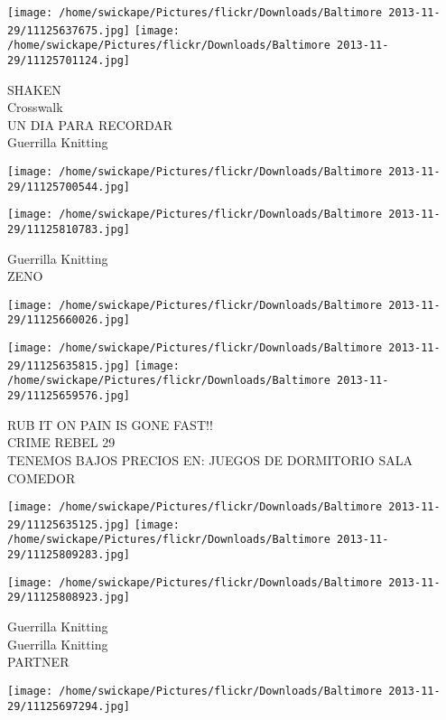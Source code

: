 \documentclass[10pt,letterpaper]{article}
\begin{document}
\texttt{[image: /home/swickape/Pictures/flickr/Downloads/Baltimore 2013-11-29/11125637675.jpg]}
\texttt{[image: /home/swickape/Pictures/flickr/Downloads/Baltimore 2013-11-29/11125701124.jpg]}

SHAKEN\\
Crosswalk\\
UN DIA PARA RECORDAR\\
Guerrilla Knitting\\
\pagebreak

\texttt{[image: /home/swickape/Pictures/flickr/Downloads/Baltimore 2013-11-29/11125700544.jpg]}

\vspace{0.25in}
\texttt{[image: /home/swickape/Pictures/flickr/Downloads/Baltimore 2013-11-29/11125810783.jpg]}

Guerrilla Knitting\\
ZENO\\
\pagebreak

\texttt{[image: /home/swickape/Pictures/flickr/Downloads/Baltimore 2013-11-29/11125660026.jpg]}

\vspace{0.25in}
\texttt{[image: /home/swickape/Pictures/flickr/Downloads/Baltimore 2013-11-29/11125635815.jpg]}
\texttt{[image: /home/swickape/Pictures/flickr/Downloads/Baltimore 2013-11-29/11125659576.jpg]}

RUB IT ON PAIN IS GONE FAST!!\\
CRIME REBEL 29\\
TENEMOS BAJOS PRECIOS EN: JUEGOS DE DORMITORIO SALA COMEDOR\\
\pagebreak

\texttt{[image: /home/swickape/Pictures/flickr/Downloads/Baltimore 2013-11-29/11125635125.jpg]}
\texttt{[image: /home/swickape/Pictures/flickr/Downloads/Baltimore 2013-11-29/11125809283.jpg]}

\texttt{[image: /home/swickape/Pictures/flickr/Downloads/Baltimore 2013-11-29/11125808923.jpg]}

Guerrilla Knitting\\
Guerrilla Knitting\\
PARTNER\\
\pagebreak

\texttt{[image: /home/swickape/Pictures/flickr/Downloads/Baltimore 2013-11-29/11125697294.jpg]}
\end{document}
